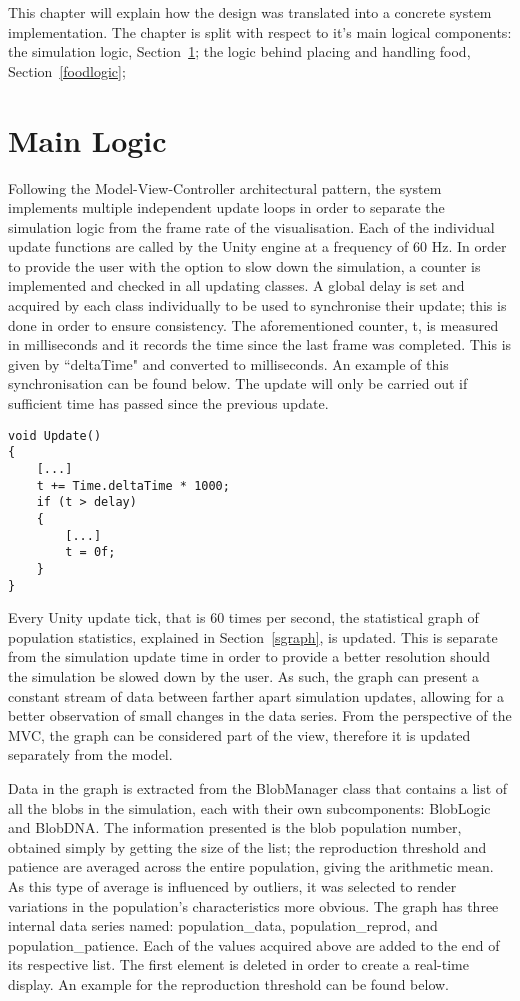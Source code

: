 This chapter will explain how the design was translated into a concrete system implementation. The chapter is split with respect to it's main logical components: the simulation logic, Section~\ref{mainlogic}; the logic behind placing and handling food, Section~\ref{foodlogic}; 

\section{Main Logic} \label{mainlogic}
Following the Model-View-Controller architectural pattern, the system implements multiple independent update loops in order to separate the simulation logic from the frame rate of the visualisation. Each of the individual update functions are called by the Unity engine at a frequency of 60 Hz. In order to provide the user with the option to slow down the simulation, a counter is implemented and checked in all updating classes. A global delay is set and acquired by each class individually to be used to synchronise their update; this is done in order to ensure consistency. The aforementioned counter, t, is measured in milliseconds and it records the time since the last frame was completed. This is given by ``deltaTime" and converted to milliseconds. An example of this synchronisation can be found below. The update will only be carried out if sufficient time has passed since the previous update.

\begin{lstlisting}
void Update()
{
    [...]
    t += Time.deltaTime * 1000;
    if (t > delay)
    {
        [...]
        t = 0f;
    }
}
\end{lstlisting}
	
Every Unity update tick, that is 60 times per second, the statistical graph of population statistics, explained in Section~\ref{sgraph}, is updated. This is separate from the simulation update time in order to provide a better resolution should the simulation be slowed down by the user. As such, the graph can present a constant stream of data between farther apart simulation updates, allowing for a better observation of small changes in the data series. From the perspective of the MVC, the graph can be considered part of the view, therefore it is updated separately from the model.
	
Data in the graph is extracted from the BlobManager class that contains a list of all the blobs in the simulation, each with their own subcomponents: BlobLogic and BlobDNA. The information presented is the blob population number, obtained simply by getting the size of the list; the reproduction threshold and patience are averaged across the entire population, giving the arithmetic mean. As this type of average is influenced by outliers, it was selected to render variations in the population's characteristics more obvious.
The graph has three internal data series named: population\_data, population\_reprod, and population\_patience. Each of the values acquired above are added to the end of its respective list. The first element is deleted in order to create a real-time display. An example for the reproduction threshold can be found below.

